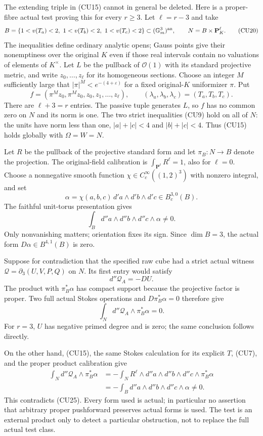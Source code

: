 The extending triple in (CU15) cannot in general be deleted.
Here is a proper-fibre actual test proving this for every $r\ge3$.
Let $\ell=r-3$ and take
\[
 B=\{1<v(T_a)<2,\ 1<v(T_b)<2,\ 1<v(T_c)<2\}
                         \subset(\mathbb G_m^3)^{\rm an},
 \qquad N=B\times\mathbf P^\ell_K.
 \tag{CU20}
\]
The inequalities define ordinary analytic opens; Gauss points
give their nonemptiness over the original $K$ even if those real
intervals contain no valuations of elements of $K^\times$.
Let $L$ be the pullback of $\mathcal O(1)$ with its standard
projective metric, and write $z_0,\ldots,z_\ell$ for its homogeneous
sections.  Choose an integer $M$ sufficiently large that
$|\pi|^M<e^{-(4+\varepsilon)}$ for a fixed original-$K$ uniformizer
$\pi$.  Put
\[
 f=(\pi^M z_0,\pi^M z_0,z_0,z_1,\ldots,z_\ell),
 \qquad (\lambda_a,\lambda_b,\lambda_c)=(T_a,T_b,T_c).
 \tag{CU21}
\]
There are $\ell+3=r$ entries.  The passive tuple generates $L$,
so $f$ has no common zero on $N$ and its norm is one.  The two
strict inequalities (CU9) hold on all of $N$: the units have
norm less than one, $|a|+|c|<4$ and $|b|+|c|<4$.  Thus (CU15)
holds globally with $\Omega=W=N$.

Let $R$ be the pullback of the projective standard form and let
$\pi_B:N\to B$ denote the projection.  The original-field calibration
is $\int_{\mathbf P^\ell}R^\ell=1$, also for $\ell=0$.
Choose a nonnegative smooth function
$\chi\in C_c^\infty((1,2)^3)$ with nonzero integral, and set
\[
 \alpha=\chi(a,b,c)\,d'a\wedge d'b\wedge d'c
                                  \in B_c^{3,0}(B).
 \tag{CU22}
\]
The faithful unit-torus presentation gives
\[
 \int_B d''a\wedge d''b\wedge d''c\wedge\alpha\ne0.
 \tag{CU23}
\]
Only nonvanishing matters; orientation fixes its sign.  Since
$\dim B=3$, the actual form $D\alpha\in B^{4,1}(B)$ is zero.

Suppose for contradiction that the specified raw cube had a strict
actual witness $\mathcal Q=\partial_3(U,V,P,Q)$ on $N$.
Its first entry would satisfy
\[
                       d''\mathcal Q_A=-DU.
 \tag{CU24}
\]
The product with $\pi_B^*\alpha$ has compact support because the
projective factor is proper.  Two full actual Stokes operations and
$D\pi_B^*\alpha=0$ therefore give
\[
                   \int_N d''\mathcal Q_A\wedge\pi_B^*\alpha=0.
 \tag{CU25}
\]
For $r=3$, $U$ has negative primed degree and is zero; the same
conclusion follows directly.

On the other hand, (CU15), the same Stokes calculation for its
explicit $T$, (CU7), and the proper product calibration give
\[
 \begin{split}
 \int_N d''\mathcal Q_A\wedge\pi_B^*\alpha
 &=-\int_N R^\ell\wedge d''a\wedge d''b\wedge d''c
                                            \wedge\pi_B^*\alpha\\
 &=-\int_B d''a\wedge d''b\wedge d''c\wedge\alpha\ne0.
 \end{split}
 \tag{CU26}
\]
This contradicts (CU25).  Every form used is actual; in particular
no assertion that arbitrary proper pushforward preserves actual
forms is used.  The test is an external product only to detect a
particular obstruction, not to replace the full actual test class.

